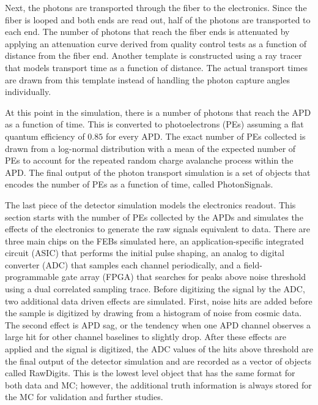 Next, the photons are transported through the fiber to the electronics. Since the fiber is looped and both ends are read out, half of the photons are transported to each end. The number of photons that reach the fiber ends is attenuated by applying an attenuation curve derived from quality control tests as a function of distance from the fiber end. Another template is constructed using a ray tracer that models transport time as a function of distance. The actual transport times are drawn from this template instead of handling the photon capture angles individually.

At this point in the simulation, there is a number of photons that reach the APD as a function of time. This is converted to photoelectrons (PEs) assuming a flat quantum efficiency of $0.85$ for every APD. The exact number of PEs collected is drawn from a log-normal distribution with a mean of the expected number of PEs to account for the repeated random charge avalanche process within the APD. The final output of the photon transport simulation is a set of objects that encodes the number of PEs as a function of time, called PhotonSignals.


The last piece of the detector simulation models the electronics readout. This section starts with the number of PEs collected by the APDs and simulates the effects of the electronics to generate the raw signals equivalent to data. There are three main chips on the FEBs simulated here, an application-specific integrated circuit (ASIC) that performs the initial pulse shaping, an analog to digital converter (ADC) that samples each channel periodically, and a field-programmable gate array (FPGA) that searches for peaks above noise threshold using a dual correlated sampling trace. Before digitizing the signal by the ADC, two additional data driven effects are simulated. First, noise hits are added before the sample is digitized by drawing from a histogram of noise from cosmic data. The second effect is APD sag, or the tendency when one APD channel observes a large hit for other channel baselines to slightly drop. After these effects are applied and the signal is digitized, the ADC values of the hits above threshold are the final output of the detector simulation and are recorded as a vector of objects called RawDigits. This is the lowest level object that has the same format for both data and MC; however, the additional truth information is always stored for the MC for validation and further studies.

